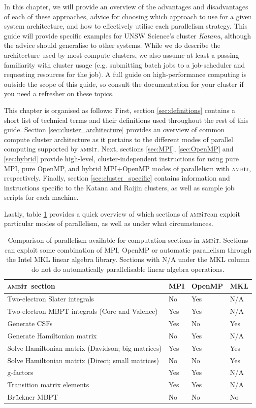 \documentclass{report}
\newcommand{\ambit}{\textsc{amb}{\footnotesize i}\textsc{t}}
\begin{document}
In this chapter, we will provide an overview of the advantages and disadvantages of each of these
approaches, advice for choosing which approach to use for a given system architecture, and how to
effectively utilise each parallelism strategy. This guide will provide specific examples for UNSW 
Science's cluster \textit{Katana}, although the advice should generalise to other systems. While we do
describe the architecture used by most compute clusters, we also assume at least a passing familiarity
with cluster usage (e.g. submitting batch jobs to a job-scheduler and requesting resources for the job).
A full guide on high-performance computing is outside the scope of this guide, so consult the
documentation for your cluster if you need a refresher on these topics.

This chapter is organised as follows:
First, section \ref{sec:definitions} contains a short list of technical terms and their definitions used
throughout the rest of this guide. Section \ref{sec:cluster_architecture} provides an overview of common
compute cluster architecture as it pertains to the different modes of parallel computing supported by
\ambit. Next, sections \ref{sec:MPI}, \ref{sec:OpenMP} and \ref{sec:hybrid} provide high-level,
cluster-independent instructions for using pure MPI, pure OpenMP, and hybrid MPI+OpenMP modes of 
parallelism with \ambit, respectively. Finally, section \ref{sec:cluster_specific} contains information
and instructions specific to the Katana and Raijin clusters, as well as sample job scripts for each
machine.

Lastly, table \ref{tab:parallelism} provides a quick overview of which sections of \ambit can exploit
particular modes of parallelism, as well as under what circumstances.


\begin{table}
\label{tab:parallelism}
\caption{Comparison of parallelism available for computation sections in \ambit. Sections can exploit
some combination of MPI, OpenMP or automatic parallelism through the Intel MKL linear algebra library.
Sections with N/A under the MKL column do not do automatically parallelisable linear algebra operations.}
\begin{tabular}{l l l l}
\hline
\ambit~section & MPI   &OpenMP  &MKL\\
\hline
\hline
Two-electron Slater integrals   &No &Yes &N/A\\
Two-electron MBPT integrals (Core and Valence) &Yes    &Yes    &N/A\\
Generate CSFs   &Yes    &No &Yes\\
Generate Hamiltonian matrix     &No &Yes    &N/A\\
Solve Hamiltonian matrix (Davidson; big matrices) &Yes    &Yes    &Yes\\
Solve Hamiltonian matrix (Direct; small matrices)   &No &No &Yes\\
g-factors   &Yes    &Yes    &N/A\\
Transition matrix elements  &Yes    &Yes    &N/A\\
Br\"{u}ckner MBPT   &No &No &No\\
\hline
\end{tabular}
\end{table}
\end{document}
